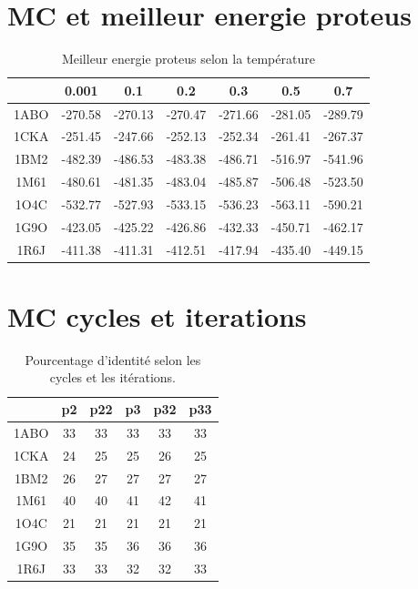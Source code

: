 \documentclass[a4paper,12pt]{article}
\begin{document}
\section{MC et meilleur energie proteus}

    \begin{table}[!htbp]
      \centering


      \begin{tabular}{|c|c|c|c|c|c|c|}

     
        \hline
         & 0.001 & 0.1 & 0.2  & 0.3 & 0.5 & 0.7  \\
        \hline
        1ABO & -270.58 & -270.13 & -270.47 & -271.66 & -281.05  & -289.79 \\      
        1CKA & -251.45 & -247.66 & -252.13 & -252.34 & -261.41  & -267.37 \\  
        1BM2 & -482.39 & -486.53 & -483.38 & -486.71 & -516.97  & -541.96 \\  
        1M61 & -480.61 & -481.35 & -483.04 & -485.87 & -506.48  & -523.50 \\  
        1O4C & -532.77 & -527.93 & -533.15 & -536.23 & -563.11  & -590.21 \\  
        1G9O & -423.05 & -425.22 & -426.86 & -432.33 & -450.71  & -462.17 \\  
        1R6J & -411.38 & -411.31 & -412.51 & -417.94 & -435.40  & -449.15 \\  \hline
        
      \end{tabular}
      

      \caption{Meilleur energie proteus selon la température}      
      \label{tab_ener}
    \end{table}


\section{MC cycles et iterations}

    \begin{table}[!htbp]
      \centering
      
      \begin{tabular}{|c|c|c|c|c|c|}

        \hline
        & p2 & p22 & p3  & p32 & p33   \\
        \hline
        1ABO & 33 & 33 & 33 & 33 & 33  \\      
        1CKA & 24 & 25 & 25 & 26 & 25  \\  
        1BM2 & 26 & 27 & 27 & 27 & 27  \\  
        1M61 & 40 & 40 & 41 & 42 & 41  \\  
        1O4C & 21 & 21 & 21 & 21 & 21  \\  
        1G9O & 35 & 35 & 36 & 36 & 36  \\  
        1R6J & 33 & 33 & 32 & 32 & 33  \\  \hline
        
      \end{tabular}
      

      \caption{Pourcentage d'identité selon les cycles et les itérations.}      
      \label{tab_iter}
    \end{table}
\end{document}
